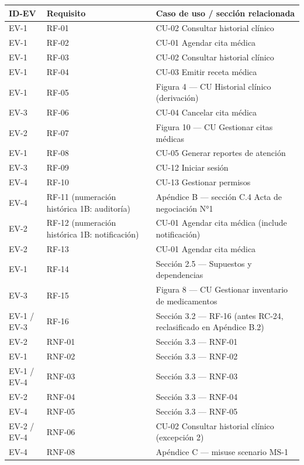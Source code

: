 \documentclass[11pt,a4paper]{article}
\begin{document}
	\begin{longtable}{p{} p{} p{}}
		
		\toprule
		\textbf{ID-EV} &
		\textbf{Requisito} &
		\textbf{Caso de uso / sección relacionada} \\
		\midrule
		\endhead
		
		\bottomrule
		\endlastfoot
		EV-1 & RF-01 & CU-02 Consultar historial clínico \\
		EV-1 & RF-02 & CU-01 Agendar cita médica \\
		EV-1 & RF-03 & CU-02 Consultar historial clínico \\
		EV-1 & RF-04 & CU-03 Emitir receta médica \\
		EV-1 & RF-05 & Figura 4 --- CU Historial clínico (derivación) \\
		EV-3 & RF-06 & CU-04 Cancelar cita médica \\
		EV-2 & RF-07 & Figura 10 --- CU Gestionar citas médicas \\
		EV-1 & RF-08 & CU-05 Generar reportes de atención \\
		EV-3 & RF-09 & CU-12 Iniciar sesión \\
		EV-4 & RF-10 & CU-13 Gestionar permisos \\
		EV-4 & RF-11 (numeración histórica 1B: auditoría) & Apéndice B --- sección C.4 Acta de negociación N°1 \\
		EV-2 & RF-12 (numeración histórica 1B: notificación) & CU-01 Agendar cita médica (include notificación) \\
		EV-2 & RF-13 & CU-01 Agendar cita médica \\
		EV-1 & RF-14 & Sección 2.5 --- Supuestos y dependencias \\
		EV-3 & RF-15 & Figura 8 --- CU Gestionar inventario de medicamentos \\
		EV-1 / EV-3 & RF-16 & Sección 3.2 --- RF-16 (antes RC-24, reclasificado en Apéndice B.2) \\
		EV-2 & RNF-01 & Sección 3.3 --- RNF-01 \\
		EV-1 & RNF-02 & Sección 3.3 --- RNF-02 \\
		EV-1 / EV-4 & RNF-03 & Sección 3.3 --- RNF-03 \\
		EV-2 & RNF-04 & Sección 3.3 --- RNF-04 \\
		EV-4 & RNF-05 & Sección 3.3 --- RNF-05 \\
		EV-2 / EV-4 & RNF-06 & CU-02 Consultar historial clínico (excepción 2) \\
		EV-4 & RNF-08 & Apéndice C --- misuse scenario MS-1 \\
	\end{longtable}
	
\end{document}
